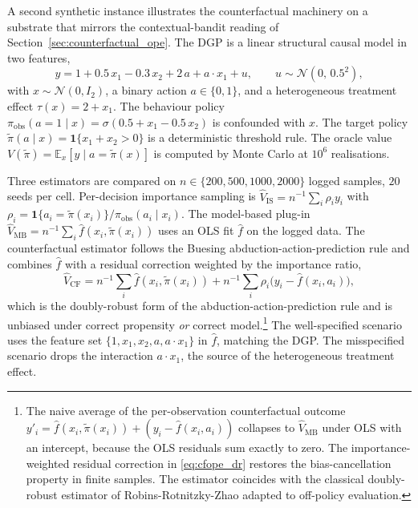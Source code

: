 A second synthetic instance illustrates the counterfactual machinery on a
substrate that mirrors the contextual-bandit reading of
Section~\ref{sec:counterfactual_ope}. The DGP is a linear structural
causal model in two features,
\begin{equation}
y = 1 + 0.5\, x_1 - 0.3\, x_2 + 2\, a + a \cdot x_1 + u,
\qquad u \sim \mathcal N(0,\, 0.5^2),
\label{eq:cfope_dgp}
\end{equation}
with $x \sim \mathcal N(0, I_2)$, a binary action $a \in \{0, 1\}$, and
a heterogeneous treatment effect $\tau(x) = 2 + x_1$. The behaviour
policy $\pi_{\mathrm{obs}}(a = 1 \mid x) = \sigma(0.5 + x_1 - 0.5\, x_2)$
is confounded with $x$. The target policy $\widetilde\pi(a \mid x) =
\mathbf 1\{x_1 + x_2 > 0\}$ is a deterministic threshold rule. The
oracle value $V(\widetilde\pi) = \mathbb E_x[y \mid a =
\widetilde\pi(x)]$ is computed by Monte Carlo at $10^6$ realisations.

Three estimators are compared on $n \in \{200, 500, 1000, 2000\}$ logged
samples, $20$ seeds per cell. Per-decision importance sampling is
$\widehat V_{\mathrm{IS}} = n^{-1} \sum_i \rho_i y_i$ with $\rho_i =
\mathbf 1\{a_i = \widetilde\pi(x_i)\} / \pi_{\mathrm{obs}}(a_i \mid
x_i)$. The model-based plug-in $\widehat V_{\mathrm{MB}} = n^{-1}
\sum_i \hat f(x_i, \widetilde\pi(x_i))$ uses an OLS fit $\hat f$ on the
logged data. The counterfactual estimator follows the Buesing
abduction-action-prediction rule and combines $\hat f$ with a
residual correction weighted by the importance ratio,
\begin{equation}
\widehat V_{\mathrm{CF}}
= n^{-1} \sum_i \hat f(x_i, \widetilde\pi(x_i))
  + n^{-1} \sum_i \rho_i \bigl(y_i - \hat f(x_i, a_i)\bigr),
\label{eq:cfope_dr}
\end{equation}
which is the doubly-robust form of the abduction-action-prediction rule
and is unbiased under correct propensity \emph{or} correct
model.\footnote{The naive average of the per-observation counterfactual
outcome $y'_i = \hat f(x_i, \widetilde\pi(x_i)) + (y_i - \hat f(x_i,
a_i))$ collapses to $\widehat V_{\mathrm{MB}}$ under OLS with an
intercept, because the OLS residuals sum exactly to zero. The
importance-weighted residual correction in \eqref{eq:cfope_dr} restores
the bias-cancellation property in finite samples. The estimator
coincides with the classical doubly-robust estimator of
Robins-Rotnitzky-Zhao adapted to off-policy evaluation.} The
well-specified scenario uses the feature set $\{1, x_1, x_2, a,
a \cdot x_1\}$ in $\hat f$, matching the DGP. The misspecified scenario
drops the interaction $a \cdot x_1$, the source of the heterogeneous
treatment effect.

